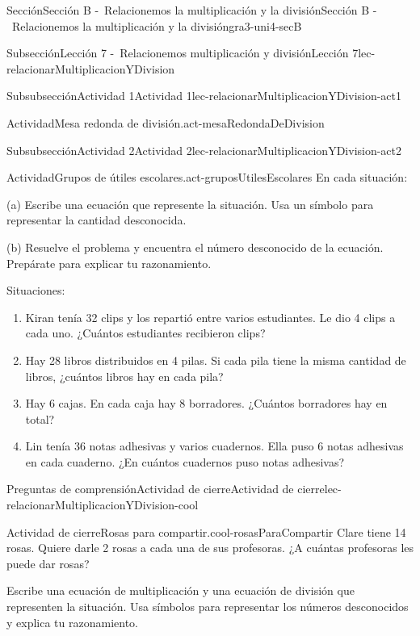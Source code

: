 \documentclass[twoside,10pt,]{article}
\begin{document}
\begin{sectionptx}{Sección}{Sección B -~Relacionemos la multiplicación y la división}{}{Sección B -~Relacionemos la multiplicación y la división}{}{}{gra3-uni4-secB}
\begin{subsectionptx}{Subsección}{Lección 7 -~Relacionemos multiplicación y división}{}{Lección 7}{}{}{lec-relacionarMultiplicacionYDivision}
\begin{subsubsectionptx}{Subsubsección}{Actividad 1}{}{Actividad 1}{}{}{lec-relacionarMultiplicacionYDivision-act1}
\begin{activity}{Actividad}{Mesa redonda de división.}{act-mesaRedondaDeDivision}
\begin{image}{0.2}{0.6}{0.2}{}
\end{image}%
\end{activity}%
\end{subsubsectionptx}
%
%
\typeout{************************************************}
\typeout{************************************************}
%
\begin{subsubsectionptx}{Subsubsección}{Actividad 2}{}{Actividad 2}{}{}{lec-relacionarMultiplicacionYDivision-act2}
\begin{activity}{Actividad}{Grupos de útiles escolares.}{act-gruposUtilesEscolares}%
En cada situación:%
\par
(a) Escribe una ecuación que represente la situación. Usa un símbolo para representar la cantidad desconocida.%
\par
(b) Resuelve el problema y encuentra el número desconocido de la ecuación. Prepárate para explicar tu razonamiento.%
\par
Situaciones:%
%
\begin{enumerate}
\item{}Kiran tenía 32 clips y los repartió entre varios estudiantes. Le dio 4 clips a cada uno. ¿Cuántos estudiantes recibieron clips?%
\item{}Hay 28 libros distribuidos en 4 pilas. Si cada pila tiene la misma cantidad de libros, ¿cuántos libros hay en cada pila?%
\item{}Hay 6 cajas. En cada caja hay 8 borradores. ¿Cuántos borradores hay en total?%
\item{}Lin tenía 36 notas adhesivas y varios cuadernos. Ella puso 6 notas adhesivas en cada cuaderno. ¿En cuántos cuadernos puso notas adhesivas?%
\end{enumerate}
\end{activity}%
\end{subsubsectionptx}
%
%
\typeout{************************************************}
\typeout{************************************************}
%
\begin{reading-questions-subsubsection}{Preguntas de comprensión}{Actividad de cierre}{}{Actividad de cierre}{}{}{lec-relacionarMultiplicacionYDivision-cool}
\begin{project}{Actividad de cierre}{Rosas para compartir.}{cool-rosasParaCompartir}%
Clare tiene 14 rosas. Quiere darle 2 rosas a cada una de sus profesoras. ¿A cuántas profesoras les puede dar rosas?%
\par
Escribe una ecuación de multiplicación y una ecuación de división que representen la situación. Usa símbolos para representar los números desconocidos y explica tu razonamiento.%

\end{project}
\end{reading-questions-subsubsection}
\end{subsectionptx}
\end{sectionptx}
\end{document}

